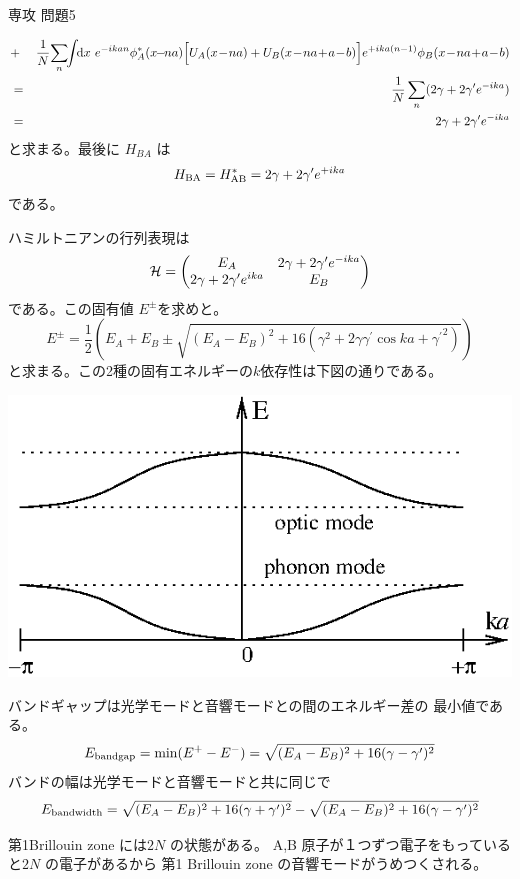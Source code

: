 \documentclass[fleqn]{jbook}
\begin{document}
\begin{answer}{専攻 問題5}{}
\begin{subanswers}
\begin{subsubanswers}
\begin{eqnarray*}
                 &+& \frac{1}{N}\! \sum_{n}\!\! \Uint{\d{x}}%
                 e^{-ikan}\phi_A^{\ast}(x\!\!-\!\!na)\Bigl[%
                   U_A(x\!-\!na)+U_B(x\!-\!na\!+\!a\!-\!b)
                 \Bigr]e^{+ika(n-1)}\phi_B(x\!-\!na\!+\!a\!-\!b) \\
             &=& \frac{1}{N} \sum_{n} (2\gamma+2\gamma' e^{-ika})\\
             &=& 2\gamma+2\gamma'e^{-ika}%
    \end{eqnarray*}
%
    と求まる。最後に  $H_{BA}$ は
%
    \[ H_{\rm BA} = H_{\rm AB}^{\ast} = 2\gamma+2\gamma'e^{+ika} \]
%
    である。
 
  \SubSubAnswer
    ハミルトニアンの行列表現は
%
    \[ {\cal{H}} =\begin{pmatrix}
                    E_A & 2\gamma + 2\gamma^{\prime} e^{-ika} \\ 
                    2\gamma + 2\gamma^{\prime} e^{ika} & E_B \cr \end{pmatrix} \] 
%
    である。この固有値 $E^{\pm}$を求めと。
%
    \[ E^{\pm}=\frac{1}{2} \left(%
           E_A+E_B \pm \sqrt{(E_A-E_B)^2+16(\gamma^2+2\gamma\gamma^{\prime} \cos ka +{\gamma^{\prime}}^2)}%
         \right) \]
%
    と求まる。この2種の固有エネルギーの$k$依存性は下図の通りである。
%
    \begin{center}
      \mbox{\includegraphics[clip]{1993phy5-1.eps}}
    \end{center}
%

  \SubSubAnswer
    バンドギャップは光学モードと音響モードとの間のエネルギー差の
    最小値である。
%
    \[ E_{\rm band gap} = {\rm min}(E^{+} - E^{-}) %
          = \sqrt{(E_A-E_B)^2+16(\gamma-\gamma^{\prime})^2} \]
%
    バンドの幅は光学モードと音響モードと共に同じで
%
    \[ E_{\rm band width}%
        = \sqrt{(E_A-E_B)^2+16(\gamma+\gamma^{\prime})^2}%
         -\sqrt{(E_A-E_B)^2+16(\gamma-\gamma^{\prime})^2} \]


  \SubSubAnswer
    第1Brillouin zone には$2N$ の状態がある。
    A,B 原子が１つずつ電子をもっていると$2N$ の電子があるから
    第1 Brillouin zone の音響モードがうめつくされる。

  \end{subsubanswers}
\end{subanswers}
\end{answer}
\end{document}
